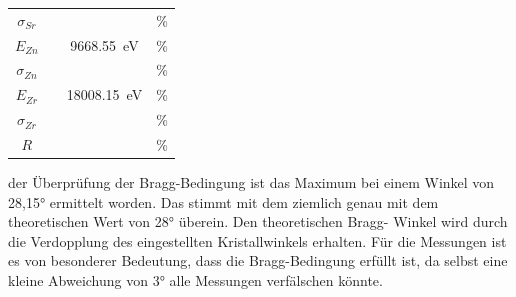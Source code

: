 \begin{table}[H]
\begin{tabular}{c c c c}
       $\sigma _{Sr} $ & \text{} & \text{} & \text{}\% \\
       $E_{Zn}$ & \text{} & \SI{9668.55}{\electronvolt}\cite{NIST} & \text{}\% \\
       $\sigma _{Zn} $ & \text{} & \text{} & \text{} \%\\
       $E_{Zr}$ & \text{} & \SI{18008.15}{\electronvolt}\cite{NIST} & \text{}\% \\
       $\sigma _{Zr} $ & \text{} & \text{} & \text{} \%\\
       $R$ & \text{} & \text{} & \text{}\% \\
    \bottomrule
\end{tabular}
\label{tab:9}
\end{table}

\justifying der Überprüfung der Bragg-Bedingung ist das Maximum bei einem Winkel von 28,15° ermittelt worden.
Das stimmt mit dem ziemlich genau mit dem theoretischen Wert von 28° überein. Den theoretischen Bragg-
Winkel wird durch die Verdopplung des eingestellten Kristallwinkels erhalten.
Für die Messungen ist es von besonderer Bedeutung, dass die Bragg-Bedingung erfüllt
ist, da selbst eine kleine Abweichung von 3° alle Messungen verfälschen könnte.\\

